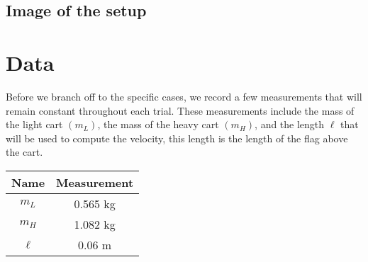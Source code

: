 \documentclass{report}
\begin{document}
    \bigbreak \noindent 
    \subsection{Image of the setup}
    \bigbreak \noindent 


    \bigbreak \noindent 
    \section{Data}
    \bigbreak \noindent 
    Before we branch off to the specific cases, we record a few measurements that will remain constant throughout each trial. These measurements include the mass of the light cart $(m_{L})$, the mass of the heavy cart $(m_{H})$, and the length $\ell$ that will be used to compute the velocity, this length is the length of the flag above the cart.
    \bigbreak \noindent 
    \begin{center}
        \begin{tabular}{c|c}
            Name & Measurement \\
            \hline
            $m_{L}$ & 0.565 kg\\
            $m_{H}$  & 1.082 kg\\
            $\ell$ & 0.06 m
        \end{tabular}
    \end{center}

    \bigbreak \noindent 
\end{document}
